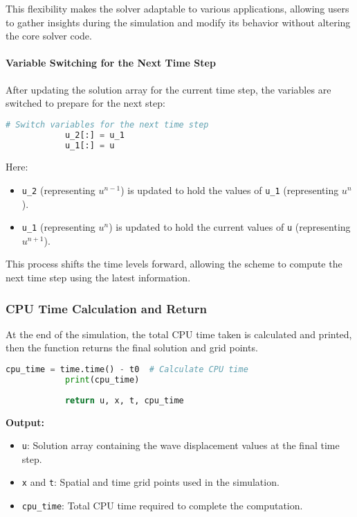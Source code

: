 \documentclass{article}
\begin{document}
		This flexibility makes the solver adaptable to various applications, allowing users to gather insights during the simulation and modify its behavior without altering the core solver code.
		
		
		\paragraph{Variable Switching for the Next Time Step}
		
		After updating the solution array for the current time step, the variables are switched to prepare for the next step:
		
		\begin{lstlisting}[language=Python, caption=Switching Variables for the Next Time Step]
			# Switch variables for the next time step
			u_2[:] = u_1
			u_1[:] = u
		\end{lstlisting}
		
		Here:
		\begin{itemize}
			\item \texttt{u\_2} (representing $u^{n-1}$) is updated to hold the values of \texttt{u\_1} (representing $u^n$).
			\item \texttt{u\_1} (representing $u^n$) is updated to hold the current values of \texttt{u} (representing $u^{n+1}$).
		\end{itemize}
		
		This process shifts the time levels forward, allowing the scheme to compute the next time step using the latest information.
		
		\subsubsection{CPU Time Calculation and Return}
		
		At the end of the simulation, the total CPU time taken is calculated and printed, then the function returns the final solution and grid points.
		
		\begin{lstlisting}[language=Python, caption=CPU Time Calculation and Return]
			cpu_time = time.time() - t0  # Calculate CPU time
			print(cpu_time)
			
			return u, x, t, cpu_time
		\end{lstlisting}
		
		\textbf{Output:}
		\begin{itemize}
			\item \texttt{u}: Solution array containing the wave displacement values at the final time step.
			\item \texttt{x} and \texttt{t}: Spatial and time grid points used in the simulation.
			\item \texttt{cpu\_time}: Total CPU time required to complete the computation.
		\end{itemize}
		
\end{document}

